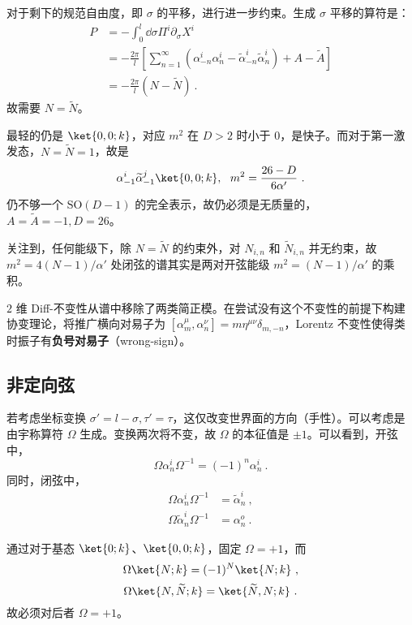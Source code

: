 对于剩下的规范自由度，即 $\sigma$ 的平移，进行进一步约束。生成 $\sigma$ 平移的算符是：
\begin{equation}
	\begin{aligned}
		P &= -\int_0^l \dd \sigma \Pi^i \partial_\sigma X^i \\
		&= -\frac{2\pi}{l} \left[\sum_{n=1}^\infty (\alpha_{-n}^i \alpha_n^i - \widetilde{\alpha}_{-n}^i \widetilde{\alpha}_n^i) + A - \widetilde{A}\right] \\
		&= -\frac{2\pi}{l} (N - \widetilde{N}) ~.
	\end{aligned}
\end{equation}
故需要 $N = \widetilde{N}$。

最轻的仍是 $\ket{0, 0; k}$，对应 $m^2$ 在 $D>2$ 时小于 $0$，是快子。而对于第一激发态，$N = \widetilde{N} = 1$，故是 
\begin{equation}
	\alpha_{-1}^i \widetilde{\alpha}_{-1}^j \ket{0, 0; k}, ~~ m^2 = \frac{26- D}{6 \alpha'} ~.
\end{equation}
仍不够一个 $\text{SO}(D-1)$ 的完全表示，故仍必须是无质量的，$A = \widetilde{A} = -1, D = 26$。

关注到，任何能级下，除 $N = \widetilde{N}$ 的约束外，对 $N_{i, n}$ 和 $\widetilde{N}_{i, n}$ 并无约束，故 $m^2 = 4(N-1)/\alpha'$ 处闭弦的谱其实是两对开弦能级 $m^2= (N-1)/\alpha'$ 的乘积。

$2$ 维 Diff-不变性从谱中移除了两类简正模。在尝试没有这个不变性的前提下构建协变理论，将推广横向对易子为 $[\alpha_m^\mu, \alpha_n^\nu] = m \eta^{\mu\nu} \delta_{m, -n}$，Lorentz 不变性使得类时振子有\textbf{负号对易子}（wrong-sign）。

\subsection{非定向弦}
若考虑坐标变换 $\sigma' = l-\sigma, \tau' = \tau$，这仅改变世界面的方向（手性）。可以考虑是由宇称算符 $\Omega$ 生成。变换两次将不变，故 $\Omega$ 的本征值是 $\pm 1$。可以看到，开弦中，
\begin{equation}
	\Omega \alpha_n^i \Omega^{-1} = (-1)^n \alpha_n^i ~.
\end{equation}
同时，闭弦中，
\begin{equation}
	\begin{aligned}
		\Omega \alpha_n^i \Omega^{-1} &= \widetilde{\alpha}_n^i ~,\\
		\Omega \widetilde{\alpha}_n^i \Omega^{-1} &= \alpha_n^o ~.
	\end{aligned}
\end{equation}

通过对于基态 $\ket{0; k}$、$\ket{0, 0; k}$，固定 $\Omega = +1$，而 
\begin{equation}
	\Omega \ket{N; k} = (-1)^N \ket{N; k} ~,
\end{equation}
\begin{equation}
	\Omega \ket{N, \widetilde{N}; k} = \ket{\widetilde{N}, N; k} ~.
\end{equation}
故必须对后者 $\Omega = + 1$。